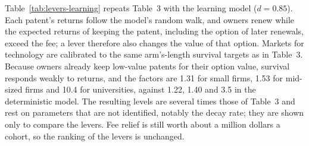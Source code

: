 Table~\ref{tab:levers-learning} repeats Table~3 with the learning model ($d=0.85$). Each patent's
returns follow the model's random walk, and owners renew while the expected returns of keeping the patent, including
the option of later renewals, exceed the fee; a lever therefore also changes the value of that option. Markets for
technology are calibrated to the same arm's-length survival targets as in Table~3. Because owners already keep
low-value patents for their option value, survival responds weakly to returns, and the factors are 1.31 for small
firms, 1.53 for mid-sized firms and 10.4 for universities, against 1.22, 1.40 and 3.5 in the deterministic model. The
resulting levels are several times those of Table~3 and rest on parameters that are not identified, notably the
decay rate; they are shown only to compare the levers. Fee relief is still worth about a million dollars a cohort,
so the ranking of the levers is unchanged.


